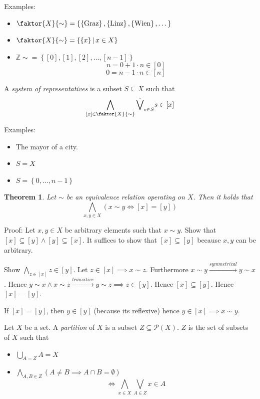 \documentclass[a4paper,landscape,twocolumn]{article}
\newcommand\set[1]{\left\{#1\right\}}
\newcommand\setdef[2]{\left\{#1\,\middle|\,#2\right\}}
\newtheorem{theorem}{Theorem}
\begin{document}
Examples:
\begin{itemize}
  \item $\faktor{X}{\sim} = \set{\set{\text{Graz}}, \set{\text{Linz}}, \set{\text{Wien}}, \dots}$
  \item $\faktor{X}{\sim} = \setdef{\set{x}}{x \in X}$
  \item $\mathbb{Z}{\sim} = \set{[0], [1], [2], \ldots, [n-1]}$
     \[ n = 0 + 1 \cdot n \in [0] \]
     \[ 0 = n - 1 \cdot n \in [n] \]
\end{itemize}

A \emph{system of representatives} is a subset $S \subseteq X$ such that
\[ \bigwedge_{[x] \in \faktor{X}{\sim}} \dot\bigvee_{s \in S} s \in [x] \]

Examples:
\begin{itemize}
  \item The mayor of a city.
  \item $S = X$
  \item $S = \set{0, \ldots, n - 1}$
\end{itemize}

\begin{theorem}
  \label{satz-1.2.9}
  Let $\sim$ be an equivalence relation operating on $X$.
  Then it holds that
  \[ \bigwedge_{x,y \in X} \left(x \sim y \iff [x] = [y]\right) \]
\end{theorem}

Proof:
Let $x,y \in X$ be arbitrary elements such that $x \sim y$.
Show that $[x] \subseteq [y] \land [y] \subseteq [x]$.
It suffices to show that $[x] \subseteq [y]$ because $x,y$ can be arbitrary.

Show $\bigwedge_{z \in [x]} z \in [y]$.
Let $z \in [x] \implies x \sim z$. Furthermore $x \sim y \xrightarrow{symmetrical} y \sim x$.
Hence $y \sim x \land x \sim z \xrightarrow{transitive} y \sim z \implies z \in [y]$.
Hence $[x] \subseteq [y]$. Hence $[x] = [y]$.

If $[x] = [y]$, then $y \in [y]$ (because its reflexive) hence $y \in [x] \implies x \sim y$.

Let $X$ be a set. A \emph{partition} of $X$ is a subset $Z \subseteq \mathcal{P}(X)$.
$Z$ is the set of subsets of $X$ such that

\begin{itemize}
  \item $\bigcup_{A = Z} A = X$
  \item $\bigwedge_{A,B \in Z} \left(A \neq B \implies A \cap B = \emptyset\right)$
    \[ \iff \bigwedge_{x \in X} \bigvee_{A \in Z} x \in A \]
\end{itemize}
\end{document}
